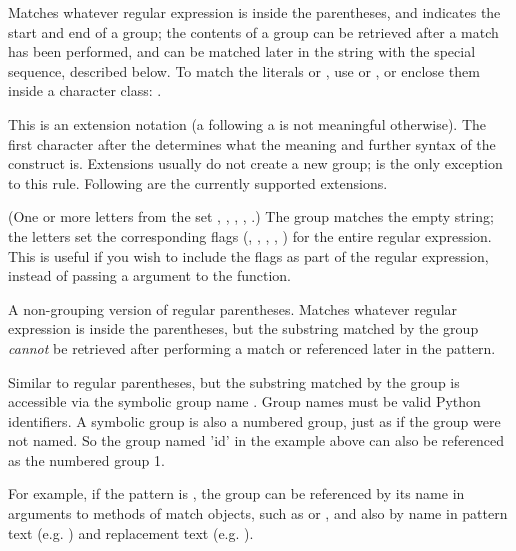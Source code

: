 \begin{list}{}{\leftmargin 0.7in }
\item[\code{(...)}] Matches whatever regular expression is inside the
parentheses, and indicates the start and end of a group; the contents
of a group can be retrieved after a match has been performed, and can
be matched later in the string with the  special
sequence, described below.  To match the literals \character{(} or
, use \regexp{\e(} or \regexp{\e)}, or enclose them
inside a character class: \regexp{[(] [)]}.

\item[\code{(?...)}] This is an extension notation (a 
following a \character{(} is not meaningful otherwise).  The first
character after the  
determines what the meaning and further syntax of the construct is.
Extensions usually do not create a new group;
 is the only exception to this rule.
Following are the currently supported extensions.

\item[\code{(?iLmsx)}] (One or more letters from the set ,
, , , .)  The group matches
the empty string; the letters set the corresponding flags
(, , , ,
) for the entire regular expression.  This is useful if
you wish to include the flags as part of the regular expression, instead
of passing a  argument to the  function. 

\item[\code{(?:...)}] A non-grouping version of regular parentheses.
Matches whatever regular expression is inside the parentheses, but the
substring matched by the 
group \emph{cannot} be retrieved after performing a match or
referenced later in the pattern. 

\item[\code{(?P<\var{name}>...)}] Similar to regular parentheses, but
the substring matched by the group is accessible via the symbolic group
name .  Group names must be valid Python identifiers.  A
symbolic group is also a numbered group, just as if the group were not
named.  So the group named 'id' in the example above can also be
referenced as the numbered group 1.

For example, if the pattern is
, the group can be referenced by its
name in arguments to methods of match objects, such as 
or , and also by name in pattern text
(e.g. ) and replacement text (e.g. ).


\end{list}
